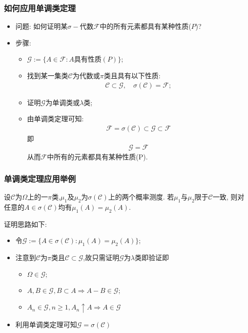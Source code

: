 \documentclass[Prob-All.tex]{subfiles}
\begin{document}
  \begin{frame}
	\frametitle{如何应用单调类定理}
	\begin{itemize}[<+-|alert@+>]
	\item 问题: 如何证明某$\sigma-$代数$\mathcal{F}$中的所有元素都具有某种性质($P$)?
	\item 步骤:
	  \begin{itemize}[<+-|alert@+>]
	  \item $\mathcal{G}:=\{A\in \mathcal{F}: A\mbox{具有性质}(P)\}$;
	  \item 找到某一集类$\mathcal{C}$为代数或$\pi$类且具有以下性质:
		\begin{eqnarray*}
		  \mathcal{C}\subset \mathcal{G}, \quad  \sigma(\mathcal{C})=\mathcal{F};
		\end{eqnarray*}
	  \item 证明$\mathcal{G}$为单调类或$\lambda$类;
	  \item 由单调类定理可知:
		\begin{eqnarray*}
		  \mathcal{F}=\sigma(\mathcal{C})\subset \mathcal{G}\subset \mathcal{F}
		\end{eqnarray*}
   即
   \begin{eqnarray*}
	 \mathcal{G}=\mathcal{F}
   \end{eqnarray*}
  从而$\mathcal{F}$中所有的元素都具有某种性质(P).
	  \end{itemize}

	\end{itemize}
  \end{frame}

\begin{frame}
	\frametitle{单调类定理应用举例}
	\begin{exam}
	  设$\mathcal{C}$为$\Omega$上的一$\pi$类,$\mu_1$及$\mu_2$为$\sigma(\mathcal{C})$上的两个概率测度. 若$\mu_1$与$\mu_2$限于$\mathcal{C}$一致, 则对任意的$A\in \sigma(\mathcal{C})$均有$\mu_1(A)=\mu_2(A)$.
	\end{exam}

	\zheng 证明思路如下:
	\begin{itemize}[<+-|alert@+>]
	\item 令$\mathcal{G}:=\{A\in \sigma(\mathcal{C}):\mu_1(A)=\mu_2(A)\}$;
	\item 注意到$\mathcal{C}$为$\pi$类且$\mathcal{C}\subset \mathcal{G}$,故只需证明$\mathcal{G}$为$\lambda$类即验证即
	  \begin{itemize}[<+-|alert@+>]
	  \item $\Omega\in \mathcal{G}$;
	  \item $A, B\in \mathcal{G}, B\subset A\Rightarrow A-B\in \mathcal{G}$;
	  \item $A_n\in \mathcal{G}, n\geq 1, A_n\uparrow A\Rightarrow A\in \mathcal{G}$
	  \end{itemize}
	\item 利用单调类定理可知$\mathcal{G}=\sigma(\mathcal{C})$
	\end{itemize}

  \end{frame}
\end{document}
